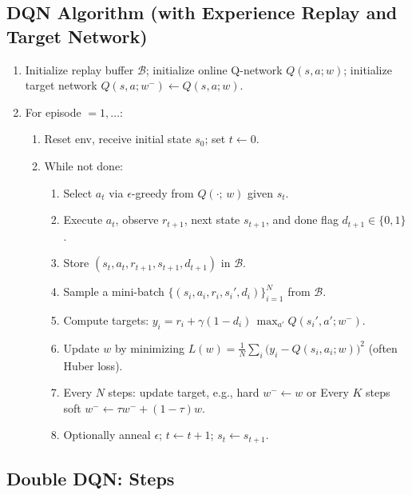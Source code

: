 \documentclass[12pt]{article}
\begin{document}
\subsection{DQN Algorithm (with Experience Replay and Target Network)}
\begin{enumerate}
    \item Initialize replay buffer $\mathcal{B}$; initialize online Q-network $Q(s,a; w)$; initialize target network $Q(s,a; w^-)\leftarrow Q(s,a; w)$.
    \item For episode $=1,\dots$:
    \begin{enumerate}
        \item Reset env, receive initial state $s_0$; set $t \leftarrow 0$.
        \item While not done:
        \begin{enumerate}
            \item Select $a_t$ via $\epsilon$-greedy from $Q(\cdot;\,w)$ given $s_t$.
            \item Execute $a_t$, observe $r_{t+1}$, next state $s_{t+1}$, and done flag $d_{t+1}\in\{0,1\}$.
            \item Store $(s_t,a_t,r_{t+1},s_{t+1},d_{t+1})$ in $\mathcal{B}$.
            \item Sample a mini-batch $\{(s_i,a_i,r_i,s_i',d_i)\}_{i=1}^N$ from $\mathcal{B}$.
            \item Compute targets: $y_i = r_i + \gamma (1-d_i)\,\max_{a'} Q(s_i',a'; w^-)$.
            \item Update $w$ by minimizing $L(w)=\frac{1}{N}\sum_i \big(y_i - Q(s_i,a_i;w)\big)^2$ (often Huber loss).
            \item Every $N$ steps: update target, e.g., hard $w^- \leftarrow w$ or Every $K$ steps soft $w^- \leftarrow \tau w^- + (1-\tau)w$.
            \item Optionally anneal $\epsilon$; $t \leftarrow t+1$; $s_t \leftarrow s_{t+1}$.
        \end{enumerate}
    \end{enumerate}
\end{enumerate}



\subsection{Double DQN: Steps}
\end{document}

